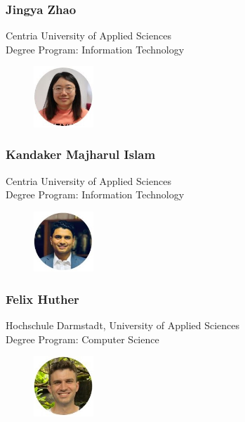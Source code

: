 \subsubsection{Jingya Zhao}
Centria University of Applied Sciences \\
Degree Program: Information Technology
\begin{figure}[h]
    \centering
    \includegraphics[width=0.2\textwidth]{images/jingya.JPG}
\end{figure}

\subsubsection{Kandaker Majharul Islam}
Centria University of Applied Sciences \\
Degree Program: Information Technology
\begin{figure}[h]
    \centering
    \includegraphics[width=0.2\textwidth]{images/ifty.JPG}
\end{figure}

\subsubsection{Felix Huther}
Hochschule Darmstadt, University of Applied Sciences \\
Degree Program: Computer Science
\begin{figure}[h]
    \centering
    \includegraphics[width=0.2\textwidth]{images/felix.JPG}
\end{figure}

